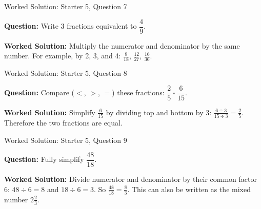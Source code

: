 \documentclass{beamer}
\newcommand{\ashow}[1]{\uncover<2->{\textcolor{red}{\small #1}}}
\begin{document}
\begin{frame}{Worked Solution: Starter 5, Question 7}

\textbf{Question:} Write 3 fractions equivalent to $\dfrac{4}{9}$.

\textbf{Worked Solution:} Multiply the numerator and denominator by the same number. For example, by 2, 3, and 4: $\frac{8}{18}$, $\frac{12}{27}$, $\frac{16}{36}$. \ashow{$\frac{8}{18},\ \frac{12}{27},\ \frac{16}{36}$.}
\end{frame}

\begin{frame}{Worked Solution: Starter 5, Question 8}

\textbf{Question:} Compare ($<$, $>$, $=$) these fractions: $\dfrac{2}{5}\ \square\ \dfrac{6}{15}$.

\textbf{Worked Solution:} Simplify $\frac{6}{15}$ by dividing top and bottom by 3: $\frac{6 \div 3}{15 \div 3} = \frac25$. Therefore the two fractions are equal. \ashow{$=$}
\end{frame}

\begin{frame}{Worked Solution: Starter 5, Question 9}

\textbf{Question:} Fully simplify $\dfrac{48}{18}$.

\textbf{Worked Solution:} Divide numerator and denominator by their common factor 6: $48 \div 6 = 8$ and $18 \div 6 = 3$. So $\frac{48}{18} = \frac83$. This can also be written as the mixed number $2\frac23$. \ashow{$\frac83$ or $2\frac23$.}
\end{frame}
\end{document}
